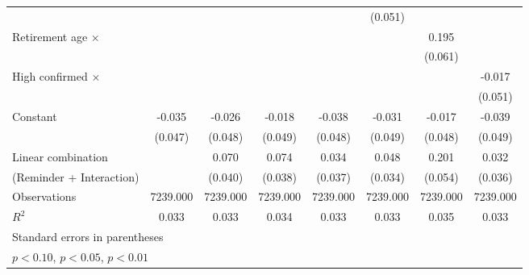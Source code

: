 {\begin{tabular}{l*{7}{c}}
                    &                     &                     &                     &                     &     (0.051)         &                     &                     \\
\addlinespace
Retirement age $\times$&                     &                     &                     &                     &                     &       0.195\sym{***}&                     \\
                    &                     &                     &                     &                     &                     &     (0.061)         &                     \\
\addlinespace
High confirmed $\times$&                     &                     &                     &                     &                     &                     &      -0.017         \\
                    &                     &                     &                     &                     &                     &                     &     (0.051)         \\
\addlinespace
Constant            &      -0.035         &      -0.026         &      -0.018         &      -0.038         &      -0.031         &      -0.017         &      -0.039         \\
                    &     (0.047)         &     (0.048)         &     (0.049)         &     (0.048)         &     (0.049)         &     (0.048)         &     (0.049)         \\
\midrule
Linear combination  &                     &       0.070         &       0.074         &       0.034         &       0.048         &       0.201         &       0.032         \\
(Reminder + Interaction)&                     &     (0.040)         &     (0.038)         &     (0.037)         &     (0.034)         &     (0.054)         &     (0.036)         \\
Observations        &    7239.000         &    7239.000         &    7239.000         &    7239.000         &    7239.000         &    7239.000         &    7239.000         \\
\(R^{2}\)           &       0.033         &       0.033         &       0.034         &       0.033         &       0.033         &       0.035         &       0.033         \\
\bottomrule
\multicolumn{8}{l}{\footnotesize Standard errors in parentheses}\\
\multicolumn{8}{l}{\footnotesize \sym{*} \(p<0.10\), \sym{**} \(p<0.05\), \sym{***} \(p<0.01\)}\\
\end{tabular}
}
